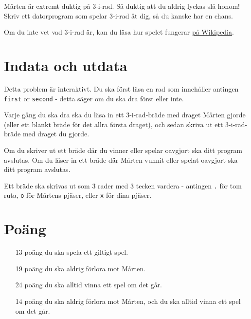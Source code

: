 
Mårten är extremt duktig på 3-i-rad. Så duktig att du aldrig lyckas slå honom! Skriv ett datorprogram som spelar 3-i-rad åt dig, så du kanske har en chans.

Om du inte vet vad 3-i-rad är, kan du läsa hur spelet fungerar \href{https://sv.wikipedia.org/wiki/Tre_i_rad}{på Wikipedia}.

\section*{Indata och utdata}
Detta problem är interaktivt. Du ska först läsa en rad som innehåller antingen \texttt{first} or \texttt{second} - detta säger om du ska dra först eller inte.

Varje gång du ska dra ska du läsa in ett 3-i-rad-bräde med draget Mårten gjorde
(eller ett blankt bräde för det allra första draget),
och sedan skriva ut ett 3-i-rad-bräde med draget du gjorde.

Om du skriver ut ett bräde där du vinner eller spelar oavgjort ska ditt program avslutas. Om du läser in ett bräde där Mårten vunnit eller spelat oavgjort ska ditt program avslutas.

Ett bräde ska skrivas ut som 3 rader med 3 tecken vardera - antingen \texttt{.} för tom ruta, \texttt{o} för Mårtens pjäser, eller \texttt{x} för dina pjäser.

\section*{Poäng}

\begin{enumerate}
	\item[13 poäng] du ska spela ett giltigt spel.
	\item[19 poäng] du ska aldrig förlora mot Mårten.
	\item[24 poäng] du ska alltid vinna ett spel om det går.
	\item[14 poäng] du ska aldrig förlora mot Mårten, och du ska alltid vinna ett spel om det går.
\end{enumerate}
